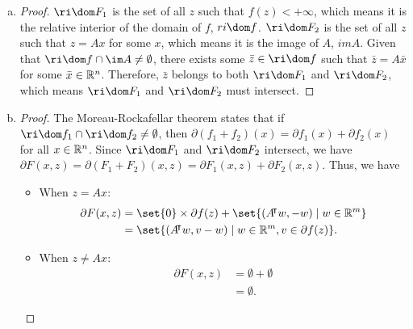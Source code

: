 \documentclass{article}
\begin{document}
\begin{solution}
\begin{enumerate}[(a)]
{\begin{proof}
\begin{itemize}
{\begin{itemize}
                            \item When $z\neq Ax$: In this case, $F_2(x,z)=+\infty$. Thus, the subgradients are empty.
                        \end{itemize}
                    }
                \end{itemize}
            \end{proof}
        }
        \item {
            \begin{proof}
                $\ri\dom F_1$ is the set of all $z$ such that $f(z)<+\infty$, which means it is the relative interior of the domain of $f$, \ie $ri\dom f$. $\ri\dom F_2$ is the set of all $z$ such that $z=Ax$ for some $x$, which means it is the image of $A$, \ie $im A$. Given that $\ri\dom f\cap\im A\neq\emptyset$, there exists some $\bar{z}\in\ri\dom f$ such that $\bar{z}=A\bar{x}$ for some $\bar{x}\in\mathbb{R}^n$. Therefore, $\bar{z}$ belongs to both $\ri\dom F_1$ and $\ri\dom F_2$, which means $\ri\dom F_1$ and $\ri\dom F_2$ must intersect.
            \end{proof}
        }
        \item {
            \begin{proof}
                The Moreau-Rockafellar theorem states that if $\ri\dom f_1\cap\ri\dom f_2\neq\emptyset$, then $\partial(f_1+f_2)(x)=\partial f_1(x)+\partial f_2(x)$ for all $x\in\mathbb{R}^n$. Since $\ri\dom F_1$ and $\ri\dom F_2$ intersect, we have $\partial F(x,z)=\partial(F_1+F_2)(x,z)=\partial F_1(x,z)+\partial F_2(x,z)$. Thus, we have
                \begin{itemize}
                    \item When $z=Ax$: {
                        \begin{align*}
                            \partial F(x,z)&=\set{0}\times\partial f(z)+\set{(A\trn w,-w)\mid w\in\R^m} \\
                            &=\set{(A\trn w,v-w)\mid w\in\R^m, v\in\partial f(z)}.\\
                        \end{align*}
                    }
                    \item When $z\neq Ax$: {
                        \begin{align*}
                            \partial F(x,z)&=\emptyset+\emptyset \\
                            &=\emptyset.
                        \end{align*}
                    }

\end{itemize}
\end{proof}}
\end{enumerate}
\end{solution}
\end{document}
